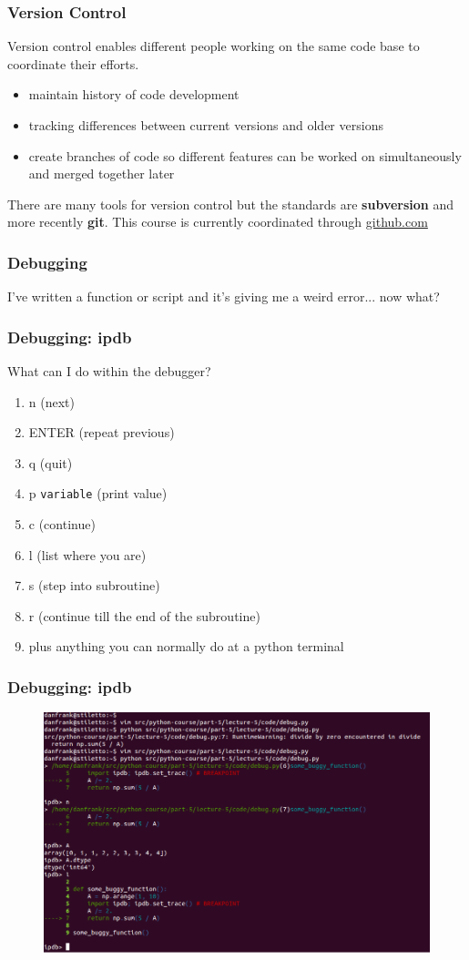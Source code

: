 \documentclass{beamer}
\begin{document}
\begin{frame}
\frametitle{Version Control}
Version control enables different people working on the same code base to coordinate their efforts.
\begin{itemize}
\setlength{\itemsep}{0.1in}
\item{maintain history of code development}
\item{tracking differences between current versions and older versions}
\item{create branches of code so different features can be worked on simultaneously and merged together later}
\end{itemize}
There are many tools for version control but the standards are \textbf{subversion} and more recently \textbf{git}. This course is currently coordinated through \url{github.com}
\end{frame}


\begin{frame}
\frametitle{Debugging}
I've written a function or script and it's giving me a weird error... now what?
\end{frame}

\begin{frame}
\frametitle{Debugging: ipdb}
What can I do within the debugger?
\begin{enumerate}
\item n (next)
\item ENTER (repeat previous)
\item q (quit)
\item p \texttt{variable} (print value)
\item c (continue)
\item l (list where you are)
\item s (step into subroutine)
\item r (continue till the end of the subroutine)
\item plus anything you can normally do at a python terminal
\end{enumerate}
\end{frame}

\begin{frame}
\frametitle{Debugging: ipdb}
\begin{figure}[h]
\centering
\includegraphics[width=.9\textwidth]{images/debug.png}
\end{figure}
\end{frame}
\end{document}
